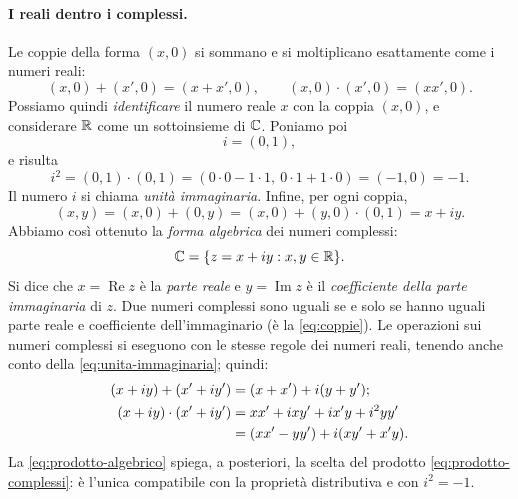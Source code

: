 \paragraph{I reali dentro i complessi.} Le coppie della forma $(x,0)$ si sommano e si
moltiplicano esattamente come i numeri reali:
\[
  (x,0)+(x',0)=(x+x',0), \qquad (x,0)\cdot(x',0)=(xx',0).
\]
Possiamo quindi \emph{identificare} il numero reale $x$ con la coppia $(x,0)$, e
considerare $\mathbb{R}$ come un sottoinsieme di $\mathbb{C}$. Poniamo poi
\[
  i=(0,1),
\]
e risulta
\begin{equation}\label{eq:unita-immaginaria}
  i^{2}=(0,1)\cdot(0,1)=(0\cdot0-1\cdot1,\ 0\cdot1+1\cdot0)=(-1,0)=-1.
\end{equation}
Il numero $i$ si chiama \emph{unità immaginaria}. Infine, per
ogni coppia,
\[
  (x,y)=(x,0)+(0,y)=(x,0)+(y,0)\cdot(0,1)=x+iy .
\]
Abbiamo così ottenuto la \emph{forma algebrica} dei numeri complessi:
\begin{equation}\label{eq:forma-algebrica}
  \mathbb{C}=\{z=x+iy : x,y\in\mathbb{R}\}.
\end{equation}
Si dice che $x=\operatorname{Re}z$ è la \emph{parte reale} e $y=\operatorname{Im}z$ è
il \emph{coefficiente della parte immaginaria} di $z$. Due numeri complessi sono uguali
se e solo se hanno uguali parte reale e coefficiente dell'immaginario (è la
\eqref{eq:coppie}). Le operazioni sui numeri complessi si eseguono con le stesse regole
dei numeri reali, tenendo anche conto della \eqref{eq:unita-immaginaria}; quindi:
\begin{align}
  (x+iy)+(x'+iy')&=(x+x')+i(y+y'); \label{eq:somma-algebrica}\\
  (x+iy)\cdot(x'+iy')&=xx'+ixy'+ix'y+i^{2}yy' \notag\\
                      &=(xx'-yy')+i(xy'+x'y). \label{eq:prodotto-algebrico}
\end{align}
La \eqref{eq:prodotto-algebrico} spiega, a posteriori, la scelta del prodotto
\eqref{eq:prodotto-complessi}: è l'unica compatibile con la proprietà distributiva e con
$i^{2}=-1$.

